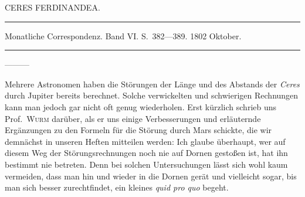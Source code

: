 \bigskip{}
\begin{center}
CERES FERDINANDEA.\par
\medskip\hrule\medskip
Monatliche Correspondenz. Band VI. S.\ 382—389. 1802 Oktober.\par
\medskip\hrule
\end{center}\medskip
—\quad —\quad —

Mehrere Astronomen haben die Störungen der Länge und des Abstands der \textit{Ceres} durch Jupiter bereits berechnet. Solche verwickelten und schwierigen Rechnungen kann man jedoch gar nicht oft genug wiederholen. Erst kürzlich schrieb uns Prof.\ \textsc{Wurm} darüber, als er uns einige Verbesserungen und erläuternde Ergänzungen zu den Formeln für die
\newcommand{\JupiterSymbol}{\text{\mdseries\AstroSymbols ♃}}
%
Störung durch Mars schickte, die wir demnächst in unseren Heften mitteilen werden: Ich glaube überhaupt, wer auf diesem Weg der Störungsrechnungen noch nie auf Dornen gestoßen ist, hat ihn bestimmt nie betreten. Denn bei solchen Untersuchungen lässt sich wohl kaum vermeiden, dass man hin und wieder in die Dornen gerät und vielleicht sogar, bis man sich besser zurechtfindet, ein kleines \textit{quid pro quo} begeht.

